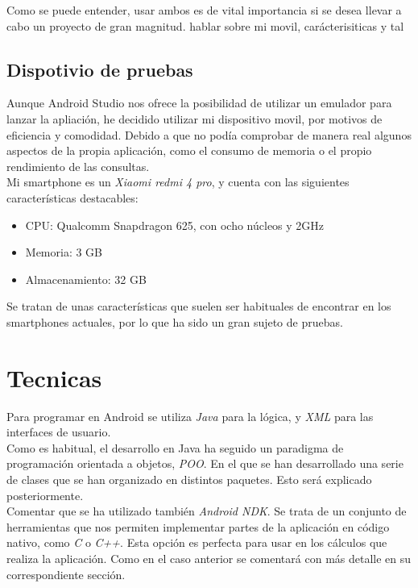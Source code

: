 Como se puede entender, usar ambos es de vital importancia si se desea llevar a cabo un proyecto de gran magnitud.
hablar sobre mi movil, carácterisiticas y tal

\subsection{Dispotivio de pruebas}

Aunque Android Studio nos ofrece la posibilidad de utilizar un emulador para lanzar la apliación, he decidido utilizar mi dispositivo movil, por motivos de eficiencia y comodidad. Debido a que no podía comprobar de manera real algunos aspectos de la propia aplicación, como el consumo de memoria o el propio rendimiento de las consultas.\\

Mi smartphone es un \textit{Xiaomi redmi 4 pro}, y cuenta con las siguientes características destacables:

\begin{itemize}
\item CPU: Qualcomm Snapdragon 625, con ocho núcleos y 2GHz 
\item Memoria: 3 GB
\item Almacenamiento: 32 GB
\end{itemize}

Se tratan de unas características que suelen ser habituales de encontrar en los smartphones actuales, por lo que ha sido un gran sujeto de pruebas.

\section{Tecnicas}

Para programar en Android se utiliza \textit{Java} para la lógica, y \textit{XML} para las interfaces de usuario.\\

Como es habitual, el desarrollo en Java ha seguido un paradigma de programación orientada a objetos, \textit{POO}. En el que se han desarrollado una serie de clases que se han organizado en distintos paquetes. Esto será explicado posteriormente.\\ 

Comentar que se ha utilizado también \textit{Android NDK}. Se trata de un conjunto de herramientas que nos permiten implementar partes de la aplicación en código nativo, como \textit{C} o \textit{C++}. Esta opción es perfecta para usar en los cálculos que realiza la aplicación. Como en el caso anterior se comentará con más detalle en su correspondiente sección.\\

